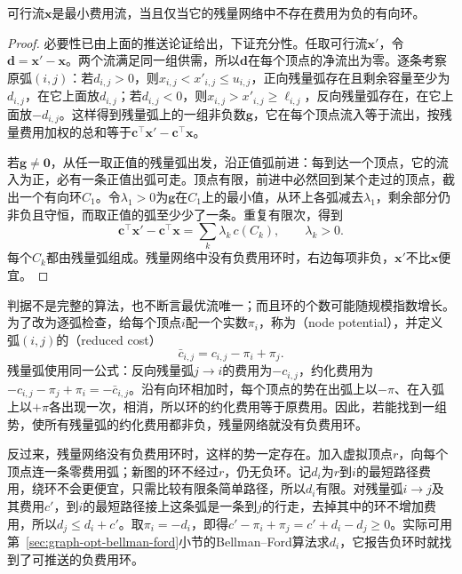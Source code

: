 \begin{theorem}[负费用环判据]
\label{thm:graph-opt-negative-cycle}
可行流$\bm x$是最小费用流，当且仅当它的残量网络中不存在费用为负的有向环。
\end{theorem}

\begin{proof}
必要性已由上面的推送论证给出，下证充分性。任取可行流$\bm x'$，令$\bm d=\bm x'-\bm x$。两个流满足同一组供需，所以$\bm d$在每个顶点的净流出为零。逐条考察原弧$(i,j)$：若$d_{i,j}>0$，则$x_{i,j}<x'_{i,j}\leq u_{i,j}$，正向残量弧存在且剩余容量至少为$d_{i,j}$，在它上面放$d_{i,j}$；若$d_{i,j}<0$，则$x_{i,j}>x'_{i,j}\geq\ell_{i,j}$，反向残量弧存在，在它上面放$-d_{i,j}$。这样得到残量弧上的一组非负数$\bm g$，它在每个顶点流入等于流出，按残量费用加权的总和等于$\bm c^{\top}\bm x'-\bm c^{\top}\bm x$。

若$\bm g\neq\bm 0$，从任一取正值的残量弧出发，沿正值弧前进：每到达一个顶点，它的流入为正，必有一条正值出弧可走。顶点有限，前进中必然回到某个走过的顶点，截出一个有向环$C_1$。令$\lambda_1>0$为$\bm g$在$C_1$上的最小值，从环上各弧减去$\lambda_1$，剩余部分仍非负且守恒，而取正值的弧至少少了一条。重复有限次，得到
\[
  \bm c^{\top}\bm x'-\bm c^{\top}\bm x=\sum_k\lambda_k\,c(C_k),\qquad\lambda_k>0.
\]
每个$C_k$都由残量弧组成。残量网络中没有负费用环时，右边每项非负，$\bm x'$不比$\bm x$便宜。
\end{proof}

判据不是完整的算法，也不断言最优流唯一；而且环的个数可能随规模指数增长。为了改为逐弧检查，给每个顶点$i$配一个实数$\pi_i$，称为（node potential），并定义弧$(i,j)$的（reduced cost）
\begin{equation}
  \bar c_{i,j}=c_{i,j}-\pi_i+\pi_j.
  \label{eq:graph-opt-reduced-cost}
\end{equation}
残量弧使用同一公式：反向残量弧$j\to i$的费用为$-c_{i,j}$，约化费用为$-c_{i,j}-\pi_j+\pi_i=-\bar c_{i,j}$。沿有向环相加时，每个顶点的势在出弧上以$-\pi$、在入弧上以$+\pi$各出现一次，相消，所以环的约化费用等于原费用。因此，若能找到一组势，使所有残量弧的约化费用都非负，残量网络就没有负费用环。

反过来，残量网络没有负费用环时，这样的势一定存在。加入虚拟顶点$r$，向每个顶点连一条零费用弧；新图的环不经过$r$，仍无负环。记$d_i$为$r$到$i$的最短路径费用，绕环不会更便宜，只需比较有限条简单路径，所以$d_i$有限。对残量弧$i\to j$及其费用$c'$，到$i$的最短路径接上这条弧是一条到$j$的行走，去掉其中的环不增加费用，所以$d_j\leq d_i+c'$。取$\pi_i=-d_i$，即得$c'-\pi_i+\pi_j=c'+d_i-d_j\geq0$。实际可用第~\ref{sec:graph-opt-bellman-ford}小节的Bellman--Ford算法求$d_i$，它报告负环时就找到了可推送的负费用环。

